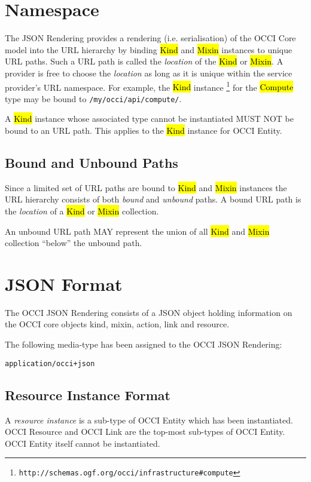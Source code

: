 \documentclass[10pt,a4paper]{article}
\begin{document}
\section{Namespace}

The JSON Rendering provides a rendering (i.e. serialisation) of the OCCI 
Core model into the URL hierarchy by binding
\hl{Kind} and \hl{Mixin} instances to unique URL paths. Such a URL path is called
the {\em location} of the \hl{Kind} or \hl{Mixin}.
A provider is free to choose the {\em location} as long as it is unique
within the service provider's URL namespace.
For example, the \hl{Kind} instance%
\footnote{\tt http://schemas.ogf.org/occi/infrastructure\#compute}
for the \hl{Compute} type may be bound to {\tt /my/occi/api/compute/}.

A \hl{Kind} instance whose associated type cannot be instantiated MUST NOT be
bound to an URL path. This applies to the \hl{Kind} instance for OCCI Entity.

\subsection{Bound and Unbound Paths}

Since a limited set of URL paths are bound to \hl{Kind} and \hl{Mixin}
instances the URL hierarchy consists of both {\em bound} and {\em unbound}
paths.
A bound URL path is the {\em location} of a \hl{Kind} or \hl{Mixin} collection.

An unbound URL path MAY represent the union of all \hl{Kind} and \hl{Mixin}
collection ``below'' the unbound path.

\section{JSON Format}
\label{sec:json_format}
The OCCI JSON Rendering consists of a JSON object holding information on the 
OCCI core objects kind, mixin, action, link and resource.

The following media-type has been assigned to the OCCI JSON Rendering:

{\tt application/occi+json}

\subsection{Resource Instance Format}
\label{sec:format_resource}

A {\em resource instance} is a sub-type of OCCI Entity which has been instantiated.
OCCI Resource and OCCI Link are the top-most sub-types of OCCI Entity.
OCCI Entity itself cannot be instantiated.
\end{document}
